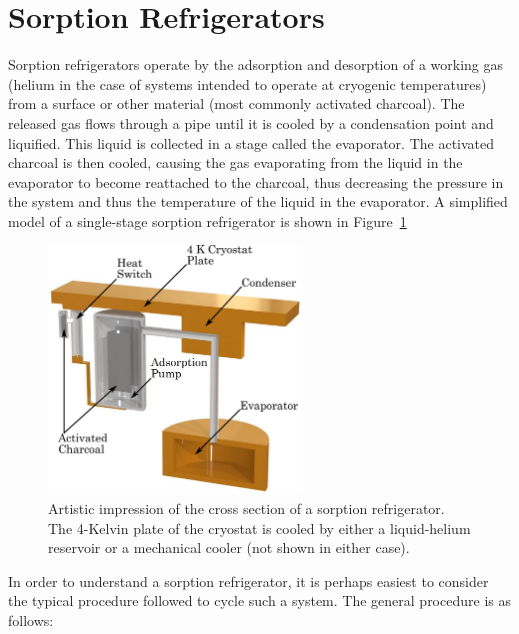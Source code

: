 \section{Sorption Refrigerators}\label{sec:sorptionRefrigerators}
Sorption refrigerators operate by the adsorption and desorption of a working gas (helium in the case of systems intended to operate at cryogenic temperatures) from a surface or other material (most commonly activated charcoal). The released gas flows through a pipe until it is cooled by a condensation point and liquified. This liquid is collected in a stage called the evaporator. The activated charcoal is then cooled, causing the gas evaporating from the liquid in the evaporator to become reattached to the charcoal, thus decreasing the pressure in the system and thus the temperature of the liquid in the evaporator. A simplified model of a single-stage sorption refrigerator is shown in Figure~\ref{fig:sorptionPumpCrossSec}
\begin{figure}[tb]
\begin{center}
\includegraphics[width = 0.6\textwidth]{figures/sorptionPump}
\caption[Simplified model of the cross section of a sorption refrigerator]{Artistic impression of the cross section of a sorption refrigerator. The 4-Kelvin plate of the cryostat is cooled by either a liquid-helium reservoir or a mechanical cooler (not shown in either case).}
\label{fig:sorptionPumpCrossSec}
\end{center}
\end{figure}
\par 
In order to understand a sorption refrigerator, it is perhaps easiest to consider the typical procedure followed to cycle such a system. The general procedure is as follows:
